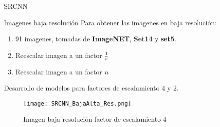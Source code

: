 \begin{frame}{SRCNN}
    \begin{block}{Imagenes baja resolución}
        Para obtener las imagenes en baja resolución:
        \begin{enumerate}
            \item 91 imagenes, tomadas de \textbf{ImageNET}, \textbf{Set14} y \textbf{set5}.
            \item Reescalar imagen a un factor $\frac{1}{n}$
            \item Reescalar imagen a un factor $n$
        \end{enumerate}
    \end{block}
    Desarrollo de modelos para factores de escalamiento $4$ y $2$.
    \begin{figure}[H]
        \label{fig:SRCNN_BajaAltaRes}
        \centering
        \texttt{[image: SRCNN\_BajaAlta\_Res.png]}
        \caption{Imagen baja resolución factor de escalamiento $4$}
    \end{figure}
\end{frame}

